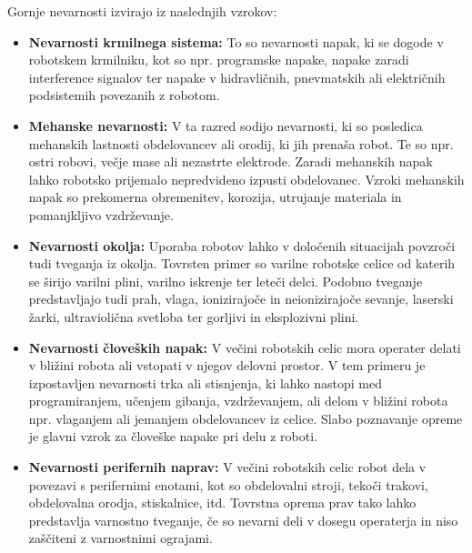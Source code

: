Gornje nevarnosti izvirajo iz naslednjih vzrokov:
\begin{itemize}
    \item \vspace*{-0.1cm} \textbf{Nevarnosti krmilnega sistema:} To
    so nevarnosti napak, ki se dogode v robotskem krmilniku, kot
    so npr. programske napake, napake zaradi interference signalov ter napake v
    hidravličnih, pnevmatskih ali električnih podsistemih povezanih z robotom.
    \item \vspace*{-0.1cm} \textbf{Mehanske nevarnosti:} V ta
    razred sodijo nevarnosti, ki so posledica mehanskih lastnosti
    obdelovancev ali orodij, ki jih prenaša robot. Te so npr. ostri
    robovi, večje mase ali nezastrte elektrode. Zaradi mehanskih
    napak lahko robotsko prijemalo nepredvideno izpusti
    obdelovanec. Vzroki mehanskih napak so prekomerna obremenitev,
    korozija, utrujanje materiala in pomanjkljivo vzdrževanje.
    \item \vspace*{-0.1cm} \textbf{Nevarnosti okolja:} Uporaba
    robotov lahko v določenih situacijah povzroči tudi tveganja iz
    okolja. Tovrsten primer so varilne robotske celice od katerih
    se širijo varilni plini, varilno iskrenje ter leteči delci.
    Podobno tveganje predstavljajo tudi prah, vlaga, ionizirajoče in neionizirajoče
    sevanje, laserski žarki, ultraviolična svetloba ter gorljivi in
    eksplozivni plini.
    \item \vspace*{-0.1cm} \textbf{Nevarnosti človeških napak:} V
    večini robotskih celic mora operater delati v bližini robota
    ali vstopati v njegov delovni prostor. V tem primeru je
    izpostavljen nevarnosti trka ali stisnjenja, ki lahko nastopi
    med programiranjem, učenjem gibanja, vzdrževanjem, ali delom v
    bližini robota npr. vlaganjem ali jemanjem obdelovancev iz
    celice. Slabo poznavanje opreme je glavni vzrok za človeške napake pri delu z roboti.
    \item \vspace*{-0.1cm} \textbf{Nevarnosti perifernih naprav:}
    V večini robotskih celic robot dela v povezavi s perifernimi
    enotami, kot so obdelovalni stroji, tekoči trakovi,
    obdelovalna orodja, stiskalnice, itd. Tovrstna oprema prav tako
    lahko predstavlja varnostno tveganje, če so nevarni deli v
    dosegu operaterja in niso zaščiteni z varnostnimi ograjami.
\end{itemize}

